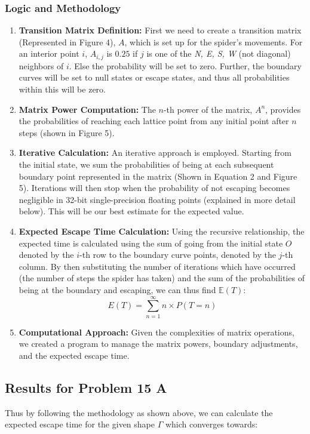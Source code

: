 \documentclass[12pt,a4paper]{article}
\begin{document}
\subsubsection{Logic and Methodology}
\begin{enumerate}
    \item \textbf{Transition Matrix Definition:} First we need to create a transition matrix (Represented in Figure 4), \(A\), which is set up for the spider's movements. For an interior point \(i\), \(A_{i,j}\) is \(0.25\) if \(j\) is one of the \textit{N, E, S, W} (not diagonal) neighbors of \(i\). Else the probability will be set to zero. Further, the boundary curves will be set to null states or escape states, and thus all probabilities within this will be zero. 
    \item \textbf{Matrix Power Computation:} The \(n\)-th power of the matrix, \(A^n\), provides the probabilities of reaching each lattice point from any initial point after \(n\) steps (shown in Figure 5).
    \item \textbf{Iterative Calculation:} An iterative approach is employed. Starting from the initial state, we sum the probabilities of being at each subsequent boundary point represented in the matrix (Shown in Equation 2 and Figure 5). Iterations will then stop when the probability of not escaping becomes negligible in 32-bit single-precision floating points (explained in more detail below). This will be our best estimate for the expected value.
    \item \textbf{Expected Escape Time Calculation:} Using the recursive relationship, the expected time is calculated using the sum of going from the initial state $O$ denoted by the $i$-th row to the boundary curve points, denoted by the $j$-th column. By then substituting the number of iterations which have occurred (the number of steps the spider has taken) and the sum of the probabilities of being at the boundary and escaping, we can thus find $\mathbb{E}(T)$:
    \[
    E(T) = \sum_{n=1}^{\infty} n \times P(T=n)
    \]
    \item \textbf{Computational Approach:} Given the complexities of matrix operations, we created a program to manage the matrix powers, boundary adjustments, and the expected escape time.
\end{enumerate}

\subsection{Results for Problem 15 A}
Thus by following the methodology as shown above, we can calculate the expected escape time for the given shape \(\Gamma\) which converges towards:
\end{document}
